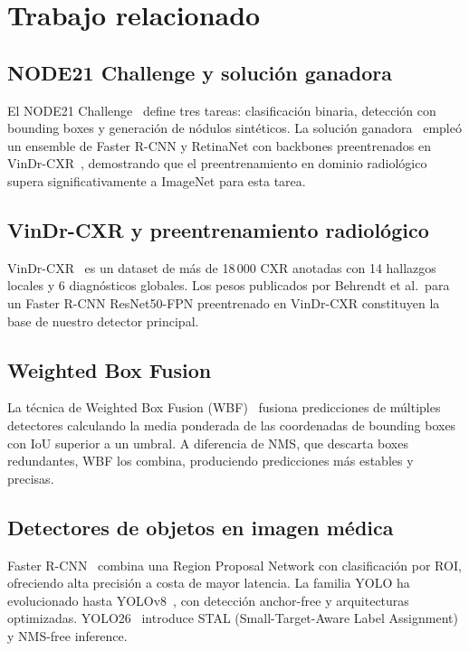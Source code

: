 \documentclass[conference]{IEEEtran}
\begin{document}
\section{Trabajo relacionado}

\subsection{NODE21 Challenge y solución ganadora}

El NODE21 Challenge~\cite{node21} define tres tareas: clasificación binaria, detección con bounding boxes y generación de nódulos sintéticos. La solución ganadora~\cite{behrendt2023} empleó un ensemble de Faster R-CNN y RetinaNet con backbones preentrenados en VinDr-CXR~\cite{vindrcxr}, demostrando que el preentrenamiento en dominio radiológico supera significativamente a ImageNet para esta tarea.

\subsection{VinDr-CXR y preentrenamiento radiológico}

VinDr-CXR~\cite{vindrcxr} es un dataset de más de 18\,000 CXR anotadas con 14 hallazgos locales y 6 diagnósticos globales. Los pesos publicados por Behrendt et al.\ para un Faster R-CNN ResNet50-FPN preentrenado en VinDr-CXR constituyen la base de nuestro detector principal.

\subsection{Weighted Box Fusion}

La técnica de Weighted Box Fusion (WBF)~\cite{solovyev2021} fusiona predicciones de múltiples detectores calculando la media ponderada de las coordenadas de bounding boxes con IoU superior a un umbral. A diferencia de NMS, que descarta boxes redundantes, WBF los combina, produciendo predicciones más estables y precisas.

\subsection{Detectores de objetos en imagen médica}

Faster R-CNN~\cite{ren2015} combina una Region Proposal Network con clasificación por ROI, ofreciendo alta precisión a costa de mayor latencia. La familia YOLO ha evolucionado hasta YOLOv8~\cite{yolov8}, con detección anchor-free y arquitecturas optimizadas. YOLO26~\cite{yolo26} introduce STAL (Small-Target-Aware Label Assignment) y NMS-free inference.
\end{document}
